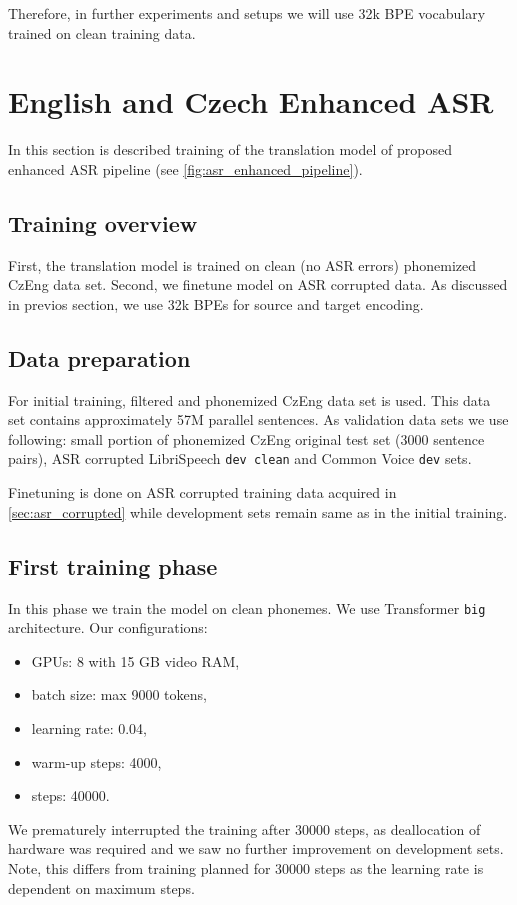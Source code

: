 Therefore, in further experiments and setups we will use 32k BPE vocabulary trained on clean training data.



\pagebreak
\section{English and Czech Enhanced ASR}
\label{easr:english}
In this section is described training of the translation model of proposed enhanced ASR pipeline (see \cref{fig:asr_enhanced_pipeline}).

\subsection{Training overview}
First, the translation model is trained on clean (no ASR errors) phonemized CzEng data set. Second, we finetune model on ASR corrupted data. As discussed in previos section, we use 32k BPEs for source and target encoding.

\subsection{Data preparation}
For initial training, filtered and phonemized CzEng data set is used. This data set contains approximately 57M parallel sentences. As validation data sets we use following: small portion of phonemized CzEng original test set (3000 sentence pairs), ASR corrupted LibriSpeech \texttt{dev clean} and Common Voice \texttt{dev} sets.

Finetuning is done on ASR corrupted training data acquired in \cref{sec:asr_corrupted} while development sets remain same as in the initial training.

\subsection{First training phase}
In this phase we train the model on clean phonemes. We use Transformer \texttt{big} architecture.
Our configurations:

\begin{itemize}
    \item GPUs: 8 with 15 GB video RAM,
    \item batch size: max 9000 tokens,
    \item learning rate: 0.04,
    \item warm-up steps: 4000,
    \item steps: 40000.
\end{itemize}

We prematurely interrupted the training after 30000 steps, as deallocation of hardware was required and we saw no further improvement on development sets. Note, this differs from training planned for 30000 steps as the learning rate is dependent on maximum steps.
